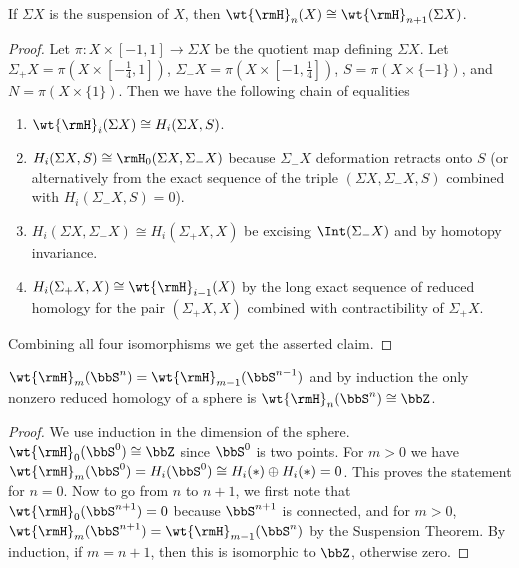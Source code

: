\begin{cor}
    If $\Sigma X$ is the suspension of $X$, then $\wt{\rmH}_n(X)\cong \wt{\rmH}_{n+1}(\Sigma X)$.
\end{cor}
\begin{proof}
    Let $\pi:X\times [-1,1]\to \Sigma X$ be the quotient map defining $\Sigma X$. Let $\Sigma_+ X=\pi(X\times [-\frac 14,1])$, $\Sigma_-X=\pi(X\times [-1,\frac14])$, $S=\pi(X\times \{-1\})$, and $N=\pi(X\times\{1\})$. Then we have the following chain of equalities
    \begin{enumerate}
        \item $\wt{\rmH}_i(\Sigma X)\cong H_i(\Sigma X,S)$.
        \item $H_i(\Sigma X,S)\cong \rmH_0(\Sigma X,\Sigma_-X)$ because $\Sigma_-X$ deformation retracts onto $S$ (or alternatively from the exact sequence of the triple $(\Sigma X,\Sigma_- X,S)$ combined with $H_i(\Sigma_-X,S)=0$).
        \item $H_i(\Sigma X,\Sigma_-X)\cong H_i(\Sigma_+X,X)$ be excising $\Int(\Sigma_-X)$ and by homotopy invariance.
        \item $H_i(\Sigma_+X,X)\cong \wt{\rmH}_{i-1}(X)$ by the long exact sequence of reduced homology for the pair $(\Sigma_+X,X)$ combined with contractibility of $\Sigma_+X$.
    \end{enumerate}
    Combining all four isomorphisms we get the asserted claim.
\end{proof}



\begin{cor}\label{reduced homology of spheres}
    $\wt{\rmH}_m(\bbS^n)=\wt{\rmH}_{m-1}(\bbS^{n-1})$ and by induction the only nonzero reduced homology of a sphere is $\wt{\rmH}_n(\bbS^n)\cong \bbZ$.
\end{cor}
\begin{proof}
     We use induction in the dimension of the sphere. $\wt{\rmH}_0(\bbS^0)\cong\bbZ$ since $\bbS^0$ is two points. For $m>0$ we have $\wt{\rmH}_m(\bbS^0)=H_i(\bbS^0)\cong H_i(\ast)\oplus H_i(\ast)=0$. This proves the statement for $n=0$. Now to go from $n$ to $n+1$, we first note that $\wt{\rmH}_0(\bbS^{n+1})=0$ because $\bbS^{n+1}$ is connected, and for $m>0$, $\wt{\rmH}_{m}(\bbS^{n+1})=\wt{\rmH}_{m-1}(\bbS^n)$ by the Suspension Theorem. By induction, if $m=n+1$, then this is isomorphic to $\bbZ$, otherwise zero.
\end{proof}

